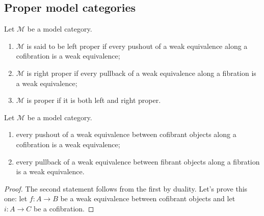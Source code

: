 \begin{refsection}
%
%
%

\subsection{Proper model categories}

\begin{defin}
Let $\mathcal M$ be a model category.
\begin{enumerate}
\item $\mathcal M$ is said to be left proper if every pushout of  a weak equivalence along a cofibration is a weak equivalence;
\item $\mathcal M$ is right proper if every pullback of a weak equivalence along a fibration is a weak equivalence;
\item $\mathcal M$ is proper if it is both left and right proper.
\end{enumerate}
\end{defin}

\begin{prop}
Let $\mathcal M$ be a model category.
\begin{enumerate}
\item every pushout of a weak equivalence between cofibrant objects along a cofibration is a weak equivalence;
\item every pullback of a weak equivalence between fibrant objects along a fibration is a weak equivalence.
\end{enumerate}
\end{prop}

\begin{proof}
The second statement follows from the first by duality. Let's prove this one: let $f \colon A \to B$ be a weak equivalence between cofibrant objects and let $i \colon A \to C$ be a cofibration.
\end{proof}


\end{refsection}
